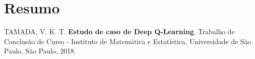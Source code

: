 %
%
%
%

\chapter*{Resumo}
%
\noindent%
TAMADA, V. K. T. \textbf{Estudo de caso de Deep Q-Learning}. Trabalho de Conclusão de Curso
 - Instituto de Matemática e Estatística, Universidade de São Paulo,
São Paulo, 2018.
\\


